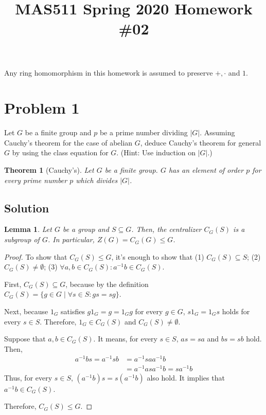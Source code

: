 \documentclass{article}
\title{MAS511 Spring 2020 Homework \#02}
\author{}
\newtheorem{theorem}{Theorem}
\newtheorem{lemma}{Lemma}
\begin{document}
\maketitle

Any ring homomorphism in this homework is assumed to preserve \(+, \cdot\) and \(1\).

\section*{Problem 1}
Let \(G\) be a finite group and \(p\) be a prime number dividing \(|G|\). Assuming Cauchy's theorem for the case of abelian \(G\), deduce Cauchy's theorem for general \(G\) by using the class equation for \(G\). (Hint: Use induction on \(|G|\).)

\begin{theorem}[Cauchy's]
  Let \(G\) be a finite group.
  \(G\) has an element of order \(p\)
  for every prime number \(p\) which divides \(|G|\).
\end{theorem}

\subsection*{Solution}

\begin{lemma}\label{lem-cen-sub}
  Let \(G\) be a group and \(S \subseteq G\). Then, the centralizer \(C_G(S)\) is a subgroup of \(G\).
  In particular, \(Z(G) = C_G(G) \le G\).
\end{lemma}
\begin{proof}
  To show that \(C_G(S) \le G\), it's enough to show that (1) \(C_G(S) \subseteq S\); (2) \(C_G(S) \neq \emptyset\); (3) \(\forall a, b \in C_G(S): a^{-1}b \in C_G(S)\).

  First, \(C_G(S) \subseteq G\),
  because by the definition \(C_G(S) = \{g \in G \mid \forall s \in S: gs = sg\}\).

  Next, 
  because \(1_G\) satisfies \(g 1_G = g = 1_G g\) for every \(g \in G\),
  \(s 1_G = 1_G s\) holds for every \(s \in S\).
  Therefore, \(1_G \in C_G(S)\) and \(C_G(S) \neq \emptyset\).

  Suppose that \(a, b \in C_G(S)\). It means, for every \(s \in S\), \(as = sa\) and \(bs = sb\) hold.
  Then,
  \begin{align*}
    a^{-1} b s
    = a^{-1} s b
    &= a^{-1} s a a^{-1} b
    \\&= a^{-1} a s a^{-1} b
    = s a^{-1} b
  \end{align*}
  Thus, for every \(s \in S\), \((a^{-1}b)s = s(a^{-1}b)\) also hold.
  It implies that \(a^{-1}b \in C_G(S)\).

  Therefore, \(C_G(S) \le G\).
\end{proof}
\end{document}
